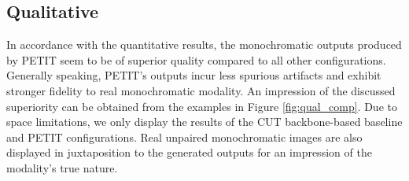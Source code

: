 \subsection{Qualitative}
In accordance with the quantitative results, the monochromatic outputs produced by PETIT seem to be of superior quality compared to all other configurations.
Generally speaking, PETIT's outputs incur less spurious artifacts and exhibit stronger fidelity to real monochromatic modality. 
An impression of the discussed superiority can be obtained from the examples in Figure \ref{fig:qual_comp}.
Due to space limitations, we only display the results of the CUT backbone-based baseline and PETIT configurations.
Real unpaired monochromatic images are also displayed in juxtaposition to the generated outputs for an impression of the modality's true nature.

